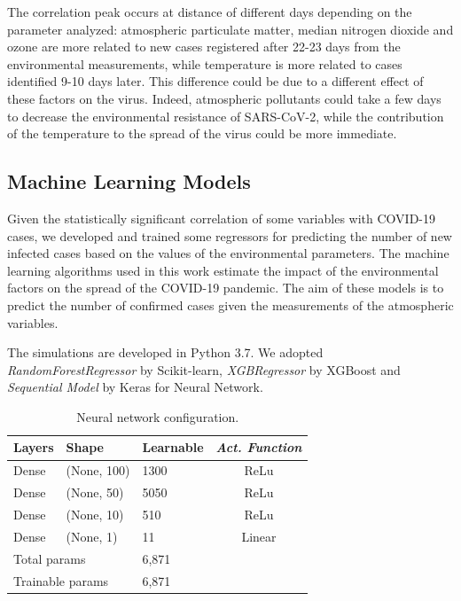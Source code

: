 \documentclass[review]{elsarticle}
\begin{document}
The correlation peak occurs at distance of different days depending on the parameter analyzed: atmospheric particulate matter, median nitrogen dioxide and ozone are more related to new cases registered after 22-23 days from the environmental measurements, while temperature is more related to cases identified 9-10 days later. This difference could be due to a different effect of these factors on the virus. Indeed, atmospheric pollutants could take a few days to decrease the environmental resistance of SARS-CoV-2, while the contribution of the temperature to the spread of the virus could be more immediate. %

\subsection{Machine Learning Models}
Given the statistically significant correlation of some variables with COVID-19 cases, we developed and trained some regressors for predicting the number of new infected cases based on the values of the environmental parameters. The machine learning algorithms used in this work estimate the impact of the environmental factors on the spread of the COVID-19 pandemic. The aim of these models is to predict the number of confirmed cases given the measurements of the atmospheric variables.

The simulations are developed in Python 3.7. We adopted \textit{RandomForestRegressor} by Scikit-learn, \textit{XGBRegressor} by XGBoost and \textit{Sequential Model} by Keras for Neural Network. 


\begin{table}[htp]
	\begin{center}
	\caption{Neural network configuration.}
	\label{tab:nnconfig}
		\begin{tabular}{lllc}%
			Layers & Shape & Learnable &  \itshape{Act. Function}\\
			\hline
Dense &             (None, 100)     &          1300   &ReLu \\   
Dense &             (None, 50)      &          5050   &ReLu \\   
Dense &            (None, 10)    &            510   &ReLu \\       
Dense &             (None, 1) &                11    & Linear\\    
\hline
\multicolumn{2}{l}{Total params} & \multicolumn{2}{l}{6,871}\\
\multicolumn{2}{l}{Trainable params} & \multicolumn{2}{l}{6,871}\\
\hline
		\end{tabular}
	\end{center}
\end{table}
\end{document}
